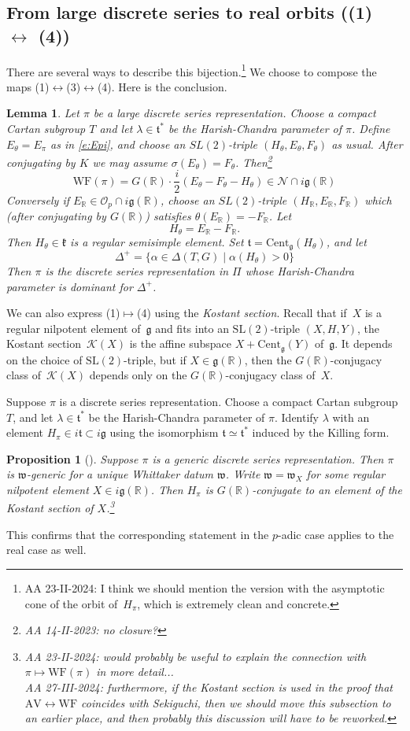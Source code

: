 \documentclass[10pt,leqno]{article}
\newtheorem{lemma}[equation]{Lemma}
\newtheorem{proposition}[equation]{Proposition}
\newcommand{\Cent}{\mathrm{Cent}}
\renewcommand{\O}{\mathcal O}
\newcommand{\R}{\mathbb R}
\newcommand{\N}{\mathcal N}
\renewcommand{\k}{\mathfrak k}
\renewcommand{\t}{\mathfrak t}
\newcommand{\g}{\mathfrak g}
\newcommand{\SL}{\text{SL}}
\newcommand{\w}{\mathfrak w}
\newcommand{\AV}{\mathrm{AV}}
\newcommand{\WF}{\mathrm{WF}}
\newcommand{\Op}{\O_p}
\newcommand{\Kostant}[1]{\mathcal{K}(#1)}
\begin{document}
\subsection{From large discrete series to real orbits ((1) $\leftrightarrow$ (4))}


There are several ways to describe this bijection.\footnote{AA 23-II-2024: I think we should mention the version with the asymptotic cone of the orbit of~$H_\pi$, which is extremely clean and concrete. } We choose to compose the maps (1)$\leftrightarrow$(3)$\leftrightarrow$(4).
Here is the conclusion.

\begin{lemma}
  Let $\pi$ be a large discrete series representation.
Choose a compact Cartan subgroup $T$ and let $\lambda\in \t^*$ be the Harish-Chandra parameter of $\pi$.
Define $E_\theta=E_\pi$ as in \eqref{e:Epi}, and choose an $SL(2)$-triple $(H_\theta,E_\theta,F_\theta)$ as usual.
After conjugating by $K$ we may assume $\sigma(E_\theta)=F_\theta$.  Then\footnote{AA 14-II-2023: no closure?}
$$
\WF(\pi)=G(\R)\cdot\frac i2(E_\theta-F_\theta-H_\theta)\in\N\cap i\g(\R)
$$
Conversely if $E_\R\in \Op\cap i\g(\R)$, choose an $SL(2)$-triple $(H_\R,E_\R,F_\R)$ which (after conjugating by $G(\R)$) satisfies $\theta(E_\R)=-F_\R$.
Let
$$
H_\theta=E_\R-F_\R.
$$
Then $H_\theta\in\k$ is a regular semisimple element.
Set $\t=\Cent_{\g}(H_\theta)$, and let
$$
\Delta^+=\{\alpha\in\Delta(T,G)\mid  \alpha(H_\theta)>0\}
$$
Then $\pi$ is the discrete series representation in $\Pi$ whose Harish-Chandra parameter is dominant for $\Delta^+$. 
\end{lemma}

We can also express (1)$\mapsto$(4) using the {\it Kostant section}. Recall that if~$X$ is a regular nilpotent element of~$\g$ and fits into an $\SL(2)$-triple $(X, H, Y)$, the Kostant section~$\Kostant{X}$ is the affine subspace $X + \mathrm{Cent}_{\g}(Y)$ of~$\g$. It depends on the choice of $\SL(2)$-triple, but if $X \in \g(\R)$, then the $G(\R)$-conjugacy class of~$\Kostant{X}$ depends only on the $G(\R)$-conjugacy class of~$X$. 

Suppose $\pi$ is a discrete series representation.
Choose a compact Cartan subgroup $T$, and let $\lambda\in\t^*$ be the Harish-Chandra parameter of $\pi$.
Identify $\lambda$ with an element $H_\pi\in i\t\subset i\g$ using the isomorphism $\t\simeq \t^*$ induced by the Killing form. 

\begin{proposition}[\cite{adams_kaletha}]
Suppose $\pi$ is a generic discrete series representation. Then $\pi$ is $\w$-generic
for a unique Whittaker datum $\w$.
Write $\w=\w_X$ for some regular nilpotent element $X\in i\g(\R)$.
Then $H_\pi$ is $G(\R)$-conjugate to an element of the Kostant section of $X$.\footnote{AA 23-II-2024: would probably be useful to explain the connection with $\pi \mapsto \WF(\pi)$ in more detail...\\ AA 27-III-2024: furthermore, if the Kostant section is used in the proof that $\AV \leftrightarrow \WF$ coincides with Sekiguchi, then we should move this subsection to an earlier place, and then probably this discussion will have to be reworked.  }
\end{proposition}


This confirms that  the corresponding statement  in the $p$-adic case \cite{debacker_reeder_generic, kaletha_epipelagic}
applies to the real case as well.



\end{document}
